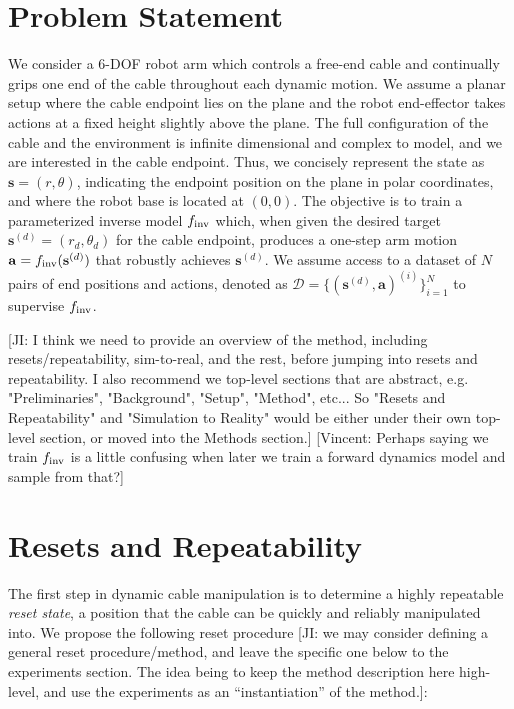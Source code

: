 \documentclass[letterpaper, 10 pt, conference]{ieeeconf}  %
\newcommand{\ba}{\mathbf{a}}
\newcommand{\state}{\mathbf{s}}
\newcommand{\remark}[3]{{\color{#2}[#1: #3]}}
\newcommand{\Vincent}[1]{\remark{Vincent}{purple}{#1}}
\newcommand{\jeffi}[1]{\remark{JI}{red}{#1}}
\begin{document}
\section{Problem Statement}\label{sec:PS}

We consider a 6-DOF robot arm which controls a free-end cable and continually grips one end of the cable throughout each dynamic motion. We assume a planar setup where the cable endpoint lies on the plane and the robot end-effector takes actions at a fixed height slightly above the plane. The full configuration of the cable and the environment is infinite dimensional and complex to model, and we are interested in the cable endpoint. Thus, we concisely represent the state as ${\state=(r, \theta)}$, indicating the endpoint position on the plane in polar coordinates, and where the robot base is located at $(0, 0)$. The objective is to train a parameterized inverse model $f_{\rm inv}$ which, when given the desired target ${\state^{(d)}=(r_d, \theta_d)}$ for the cable endpoint, produces a one-step arm motion ${\ba=f_{\rm inv}(\state^{(d)})}$ that robustly achieves $\state^{(d)}$. We assume access to a dataset of $N$ pairs of end positions and actions, denoted as ${\mathcal{D} = \{ (\state^{(d)}, \ba)^{(i)} \}_{i=1}^N}$ to supervise $f_{\rm inv}$.


\jeffi{I think we need to provide an overview of the method, including resets/repeatability, sim-to-real, and the rest, before jumping into resets and repeatability.  I also recommend we top-level sections that are abstract, e.g. "Preliminaries", "Background", "Setup", "Method", etc...  So "Resets and Repeatability" and "Simulation to Reality" would be either under their own top-level section, or moved into the Methods section.}
\Vincent{Perhaps saying we train $f_{\rm inv}$ is a little confusing when later we train a forward dynamics model and sample from that?}
\section{Resets and Repeatability}\label{sec:resets-repeat}

The first step in dynamic cable manipulation is to determine a highly repeatable \emph{reset state}, a position that the cable can be quickly and reliably manipulated into. We propose the following reset procedure \jeffi{we may consider defining a general reset procedure/method, and leave the specific one below to the experiments section.  The idea being to keep the method description here high-level, and use the experiments as an ``instantiation'' of the method.}:
\end{document}
